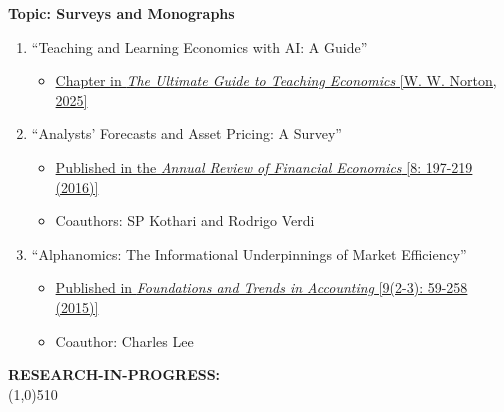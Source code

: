 \documentclass[11pt]{article}
\begin{document}
\medskip
\vspace*{.1in}
{\bf Topic: Surveys and Monographs} \\
\vspace*{-.2in}
\begin{enumerate}

\item ``Teaching and Learning Economics with AI: A Guide''
\begin{itemize}
\vspace*{-.07in}
	\item \href{https://seagull.wwnorton.com/essentialeconomics}{Chapter in {\it The Ultimate Guide to Teaching Economics} [W. W. Norton, 2025]}
\end{itemize}

\item ``Analysts' Forecasts and Asset Pricing: A Survey''
\begin{itemize}
\vspace*{-.07in}
	\item \href{https://doi.org/10.1146/annurev-financial-121415-032930}{Published in the {\it Annual Review of Financial Economics} [8: 197-219 (2016)]}
\vspace*{-.07in}
	\item Coauthors: SP Kothari and Rodrigo Verdi
\end{itemize}

\vskip 0.17cm

\item ``Alphanomics: The Informational Underpinnings of Market Efficiency''
\begin{itemize}
\vspace*{-.07in}
	\item \href{https://doi.org/10.1561/1400000022}{Published in {\it Foundations and Trends in Accounting} [9(2-3): 59-258 (2015)]}
\vspace*{-.07in}
	\item Coauthor: Charles Lee
\end{itemize}


\end{enumerate}


\vskip 0.75cm
\setlength{\parindent}{0in}
{\bf RESEARCH-IN-PROGRESS:\\}
\vskip -0.85cm \line(1,0){510} \\ 
\end{document}
